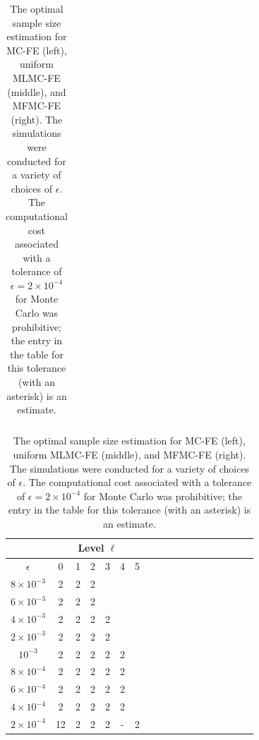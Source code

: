 \begin{table}[ht]
{\begin{tabular}{c|c|c|c|c|c|c|c|c|c|c|c|c|}
			\hline
	\end{tabular}
 \qquad
		\begin{tabular}{c|c|c|c|c|c|c|c|c|c|c|c|c|c|c|c|c|c|}
	    \cline{2-7}	
		&\multicolumn{6}{|c|}{ Level $\ell$}\\
			\hline
			\multicolumn{1}{|c|}{$\epsilon$}&0&1&2&3&4&5\\
			\hline
			\multicolumn{1}{|c|}{$8\times 10^{-3} $}&2&2&2&&&\\
			\multicolumn{1}{|c|}{$6\times 10^{-3} $}&2&2&2&&&\\
			\multicolumn{1}{|c|}{$4\times 10^{-3} $}&2&2&2&2&&\\
			\multicolumn{1}{|c|}{$2\times 10^{-3} $}&2&2&2&2&&\\
			\multicolumn{1}{|c|}{$10^{-3} $}&2&2&2&2&2&\\
			\multicolumn{1}{|c|}{$8\times 10^{-4} $}&2&2&2&2&2&\\
                \multicolumn{1}{|c|}{$6\times 10^{-4} $}&2&2&2&2&2&\\
			\multicolumn{1}{|c|}{$4\times 10^{-4} $}&2&2&2&2&2&\\
                \multicolumn{1}{|c|}{$2\times 10^{-4} $}&12&2&2&2&-&2\\
			\hline
	\end{tabular}
 
 }
	\caption{The optimal sample size estimation for MC-FE (left), uniform MLMC-FE (middle), and MFMC-FE (right). The simulations were conducted for a variety of choices of $\epsilon$. The computational cost associated with a tolerance of $\epsilon = 2\times 10^{-4}$ for Monte Carlo was prohibitive; the entry in the table for this tolerance (with an asterisk) is an estimate.}
	\label{Tab:SampleSize}
\end{table}
%

